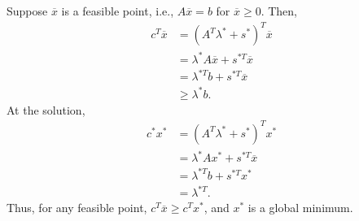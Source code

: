 \documentclass[letterpaper]{article}
\begin{document}
\begin{mdframed}
    Suppose $\overline{x}$ is a feasible point, i.e., $A\overline{x} = b$ for $\overline{x} \geq 0$. Then, 
    \begin{equation*}
        \begin{aligned}
            c^T \overline{x} &= (A^T \lambda^* + s^*)^T \overline{x} \\ 
                &= \lambda^* A \overline{x} + s^{*T} \overline{x} \\ 
                &= \lambda^{*T} b + s^{*T} \overline{x} \\ 
                &\geq \lambda^* b.
        \end{aligned}
    \end{equation*}
    At the solution,
    \begin{equation*}
        \begin{aligned}
            c^* x^* &= (A^T \lambda^* + s^*)^T x^* \\ 
                &= \lambda^* A x^* + s^{*T} \overline{x} \\ 
                &= \lambda^{*T} b + s^{*T} x^* \\ 
                &= \lambda^{*T}.
        \end{aligned}
    \end{equation*}
    Thus, for any feasible point, $c^T \overline{x} \geq c^T x^*$, and $x^*$ is a global minimum.
\end{mdframed}
\end{document}
